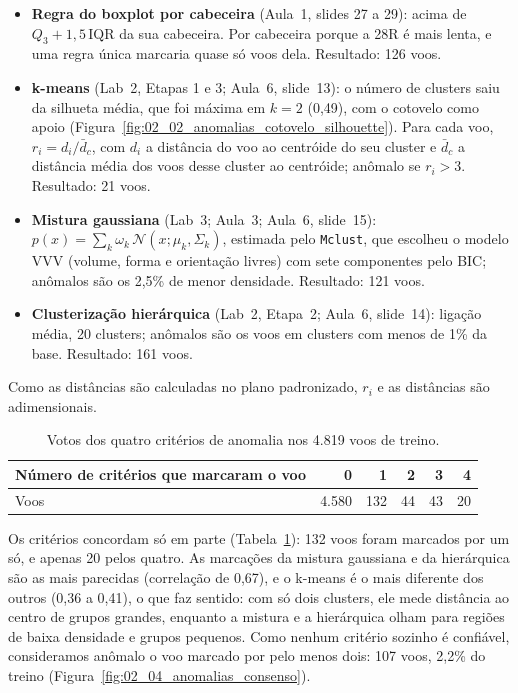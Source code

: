 \documentclass[12pt,a4paper]{article}
\begin{document}
\begin{itemize}
  \item \textbf{Regra do boxplot por cabeceira} (Aula~1, slides 27 a 29): acima de $Q_3+1{,}5\,\text{IQR}$ da sua cabeceira. Por cabeceira porque a 28R é mais lenta, e uma regra única marcaria quase só voos dela. Resultado: 126 voos.
  \item \textbf{k-means} (Lab~2, Etapas 1 e 3; Aula~6, slide~13): o número de clusters saiu da silhueta média, que foi máxima em $k=2$ (0,49), com o cotovelo como apoio (Figura~\ref{fig:02_02_anomalias_cotovelo_silhouette}). Para cada voo, $r_i=d_i/\bar{d}_c$, com $d_i$ a distância do voo ao centróide do seu cluster e $\bar{d}_c$ a distância média dos voos desse cluster ao centróide; anômalo se $r_i>3$. Resultado: 21 voos.
  \item \textbf{Mistura gaussiana} (Lab~3; Aula~3; Aula~6, slide~15): $p(x)=\sum_k \omega_k\,\mathcal{N}(x;\mu_k,\Sigma_k)$, estimada pelo \texttt{Mclust}, que escolheu o modelo VVV (volume, forma e orientação livres) com sete componentes pelo BIC; anômalos são os 2,5\% de menor densidade. Resultado: 121 voos.
  \item \textbf{Clusterização hierárquica} (Lab~2, Etapa~2; Aula~6, slide~14): ligação média, 20 clusters; anômalos são os voos em clusters com menos de 1\% da base. Resultado: 161 voos.
\end{itemize}

Como as distâncias são calculadas no plano padronizado, $r_i$ e as distâncias são adimensionais.

\begin{table}[H]\centering\small
\caption{Votos dos quatro critérios de anomalia nos 4.819 voos de treino.}\label{tab:votos}
\begin{tabular}{lrrrrr}
\toprule
Número de critérios que marcaram o voo & 0 & 1 & 2 & 3 & 4\\
\midrule
Voos & 4.580 & 132 & 44 & 43 & 20\\
\bottomrule
\end{tabular}
\end{table}

Os critérios concordam só em parte (Tabela~\ref{tab:votos}): 132 voos foram marcados por um só, e apenas 20 pelos quatro. As marcações da mistura gaussiana e da hierárquica são as mais parecidas (correlação de 0,67), e o k-means é o mais diferente dos outros (0,36 a 0,41), o que faz sentido: com só dois clusters, ele mede distância ao centro de grupos grandes, enquanto a mistura e a hierárquica olham para regiões de baixa densidade e grupos pequenos. Como nenhum critério sozinho é confiável, consideramos anômalo o voo marcado por pelo menos dois: 107 voos, 2,2\% do treino (Figura~\ref{fig:02_04_anomalias_consenso}).
\end{document}

